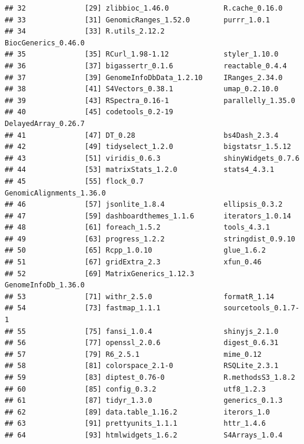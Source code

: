 \documentclass[
]{article}
\begin{document}
\begin{verbatim}
## 32              [29] zlibbioc_1.46.0             R.cache_0.16.0             
## 33              [31] GenomicRanges_1.52.0        purrr_1.0.1                
## 34              [33] R.utils_2.12.2              BiocGenerics_0.46.0        
## 35              [35] RCurl_1.98-1.12             styler_1.10.0              
## 36              [37] bigassertr_0.1.6            reactable_0.4.4            
## 37              [39] GenomeInfoDbData_1.2.10     IRanges_2.34.0             
## 38              [41] S4Vectors_0.38.1            umap_0.2.10.0              
## 39              [43] RSpectra_0.16-1             parallelly_1.35.0          
## 40              [45] codetools_0.2-19            DelayedArray_0.26.7        
## 41              [47] DT_0.28                     bs4Dash_2.3.4              
## 42              [49] tidyselect_1.2.0            bigstatsr_1.5.12           
## 43              [51] viridis_0.6.3               shinyWidgets_0.7.6         
## 44              [53] matrixStats_1.2.0           stats4_4.3.1               
## 45              [55] flock_0.7                   GenomicAlignments_1.36.0   
## 46              [57] jsonlite_1.8.4              ellipsis_0.3.2             
## 47              [59] dashboardthemes_1.1.6       iterators_1.0.14           
## 48              [61] foreach_1.5.2               tools_4.3.1                
## 49              [63] progress_1.2.2              stringdist_0.9.10          
## 50              [65] Rcpp_1.0.10                 glue_1.6.2                 
## 51              [67] gridExtra_2.3               xfun_0.46                  
## 52              [69] MatrixGenerics_1.12.3       GenomeInfoDb_1.36.0        
## 53              [71] withr_2.5.0                 formatR_1.14               
## 54              [73] fastmap_1.1.1               sourcetools_0.1.7-1        
## 55              [75] fansi_1.0.4                 shinyjs_2.1.0              
## 56              [77] openssl_2.0.6               digest_0.6.31              
## 57              [79] R6_2.5.1                    mime_0.12                  
## 58              [81] colorspace_2.1-0            RSQLite_2.3.1              
## 59              [83] diptest_0.76-0              R.methodsS3_1.8.2          
## 60              [85] config_0.3.2                utf8_1.2.3                 
## 61              [87] tidyr_1.3.0                 generics_0.1.3             
## 62              [89] data.table_1.16.2           iterors_1.0                
## 63              [91] prettyunits_1.1.1           httr_1.4.6                 
## 64              [93] htmlwidgets_1.6.2           S4Arrays_1.0.4             

\end{verbatim}
\end{document}
